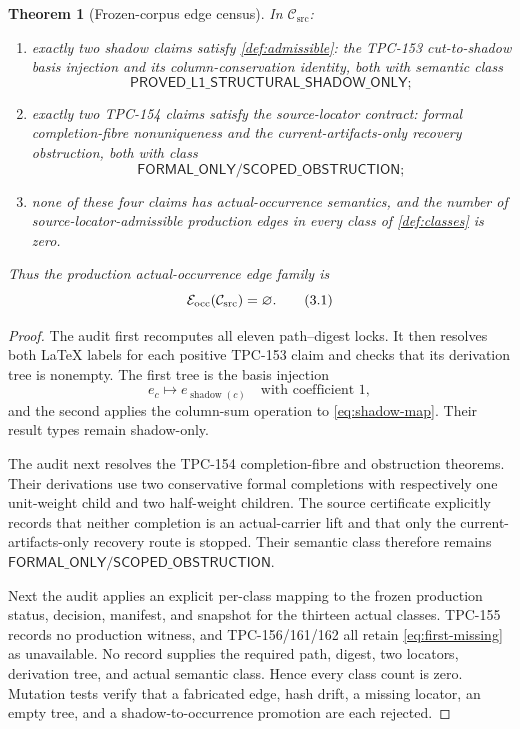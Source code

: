 \documentclass[11pt]{article}
\newtheorem{theorem}{Theorem}[section]
\theoremstyle{definition}
\theoremstyle{remark}
\newcommand{\Csrc}{\mathcal C_{\mathrm{src}}}
\begin{document}
\begin{theorem}[Frozen-corpus edge census]\label{thm:census}
In \(\Csrc\):
\begin{enumerate}[label=(\alph*),leftmargin=2.1em]
 \item exactly two shadow claims satisfy
       \cref{def:admissible}: the TPC-153 cut-to-shadow basis injection
       and its column-conservation identity, both with semantic class
       \[
        \mathsf{PROVED\_L1\_STRUCTURAL\_SHADOW\_ONLY};
       \]
 \item exactly two TPC-154 claims satisfy the source-locator contract:
       formal completion-fibre nonuniqueness and the
       current-artifacts-only recovery obstruction, both with class
       \[
        \mathsf{FORMAL\_ONLY/SCOPED\_OBSTRUCTION};
       \]
 \item none of these four claims has actual-occurrence semantics, and
       the number of source-locator-admissible production edges in
       every class of \cref{def:classes} is zero.
\end{enumerate}
Thus the production actual-occurrence edge family is
\[
 \mathcal E_{\rm occ}(\Csrc)=\varnothing .
 \tag{3.1}\label{eq:zero-edges}
\]
\end{theorem}

\begin{proof}
The audit first recomputes all eleven path--digest locks.  It then
resolves both LaTeX labels for each positive TPC-153 claim and checks
that its derivation tree is nonempty.  The first tree is the basis
injection
\[
 e_c\longmapsto e_{\operatorname{shadow}(c)}
 \quad\text{with coefficient }1,
 \tag{3.2}\label{eq:shadow-map}
\]
and the second applies the column-sum operation to
\cref{eq:shadow-map}.  Their result types remain shadow-only.

The audit next resolves the TPC-154 completion-fibre and obstruction
theorems.  Their derivations use two conservative formal completions
with respectively one unit-weight child and two half-weight children.
The source certificate explicitly records that neither completion is
an actual-carrier lift and that only the current-artifacts-only
recovery route is stopped.  Their semantic class therefore remains
\(\mathsf{FORMAL\_ONLY/SCOPED\_OBSTRUCTION}\).

Next the audit applies an explicit per-class mapping to the frozen
production status, decision, manifest, and snapshot for the thirteen
actual classes.  TPC-155 records no
production witness, and TPC-156/161/162 all retain
\cref{eq:first-missing} as unavailable.  No record supplies the
required path, digest, two locators, derivation tree, and actual
semantic class.  Hence every class count is zero.  Mutation tests
verify that a fabricated edge, hash drift, a missing locator, an empty
tree, and a shadow-to-occurrence promotion are each rejected.
\end{proof}
\end{document}
